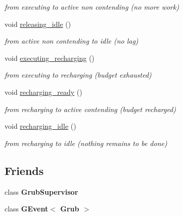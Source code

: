 \begin{DoxyCompactItemize}
\begin{DoxyCompactList}\small\item\em from executing to active non contending (no more work) \end{DoxyCompactList}\item 
void \hyperlink{classRTSim_1_1Grub_a62e2d57aa043f57f494d5d975ac6c0a1}{releasing\+\_\+idle} ()\hypertarget{classRTSim_1_1Grub_a62e2d57aa043f57f494d5d975ac6c0a1}{}\label{classRTSim_1_1Grub_a62e2d57aa043f57f494d5d975ac6c0a1}

\begin{DoxyCompactList}\small\item\em from active non contending to idle (no lag) \end{DoxyCompactList}\item 
void \hyperlink{classRTSim_1_1Grub_a5c6312d00497b7fa32b9881d7b033763}{executing\+\_\+recharging} ()\hypertarget{classRTSim_1_1Grub_a5c6312d00497b7fa32b9881d7b033763}{}\label{classRTSim_1_1Grub_a5c6312d00497b7fa32b9881d7b033763}

\begin{DoxyCompactList}\small\item\em from executing to recharging (budget exhausted) \end{DoxyCompactList}\item 
void \hyperlink{classRTSim_1_1Grub_a00eb5b3b25712b5ec9820526a51159be}{recharging\+\_\+ready} ()\hypertarget{classRTSim_1_1Grub_a00eb5b3b25712b5ec9820526a51159be}{}\label{classRTSim_1_1Grub_a00eb5b3b25712b5ec9820526a51159be}

\begin{DoxyCompactList}\small\item\em from recharging to active contending (budget recharged) \end{DoxyCompactList}\item 
void \hyperlink{classRTSim_1_1Grub_a5577dce75c52ccf50c5848ef918ac287}{recharging\+\_\+idle} ()\hypertarget{classRTSim_1_1Grub_a5577dce75c52ccf50c5848ef918ac287}{}\label{classRTSim_1_1Grub_a5577dce75c52ccf50c5848ef918ac287}

\begin{DoxyCompactList}\small\item\em from recharging to idle (nothing remains to be done) \end{DoxyCompactList}\end{DoxyCompactItemize}
\subsection*{Friends}
\begin{DoxyCompactItemize}
\item 
class {\bfseries Grub\+Supervisor}\hypertarget{classRTSim_1_1Grub_a885401be0a93519df099559bd42bcc5b}{}\label{classRTSim_1_1Grub_a885401be0a93519df099559bd42bcc5b}

\item 
class {\bfseries G\+Event$<$ Grub $>$}\hypertarget{classRTSim_1_1Grub_aa54fbb7159b4821f576b346d9b7c1c37}{}\label{classRTSim_1_1Grub_aa54fbb7159b4821f576b346d9b7c1c37}

\end{DoxyCompactItemize}
